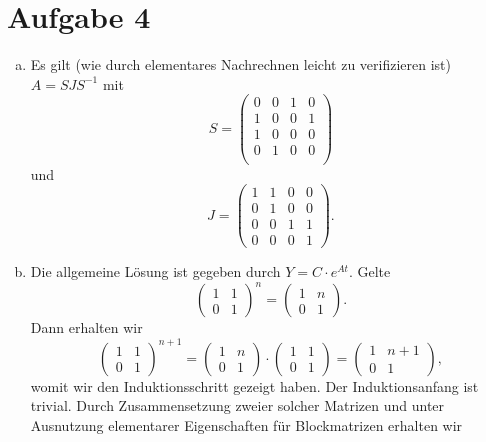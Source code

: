 \documentclass{article}
\begin{document}
\section*{Aufgabe 4}
\begin{enumerate}[(a)]
    \item Es gilt (wie durch elementares Nachrechnen leicht zu verifizieren ist) $A = SJS^{-1}$ mit
    \[
        S = \begin{pmatrix}
            0 & 0 & 1 & 0\\
            1 & 0 & 0 & 1\\
            1 & 0 & 0 & 0\\
            0 & 1 & 0 & 0\\
        \end{pmatrix}  
    \]
    und 
    \[
        J = \begin{pmatrix}
            1 & 1 & 0 & 0\\
            0 & 1 & 0 & 0\\
            0 & 0 & 1 & 1\\
            0 & 0 & 0 & 1
        \end{pmatrix}.
    \]
    \item Die allgemeine Lösung ist gegeben durch $Y = C \cdot e^{At}$.
    Gelte 
    \[
        \begin{pmatrix}
            1 & 1\\0 & 1
        \end{pmatrix}^n = \begin{pmatrix}
            1 & n\\0 & 1
        \end{pmatrix}.
    \]
    Dann erhalten wir 
    \[
        \begin{pmatrix}
            1 & 1\\0 & 1
        \end{pmatrix}^{n+1} = \begin{pmatrix}
             1 & n\\ 0 & 1
        \end{pmatrix} \cdot \begin{pmatrix}
            1 & 1\\0 & 1
        \end{pmatrix} = \begin{pmatrix}
            1 & n+1\\ 0 & 1
       \end{pmatrix},
    \]
    womit wir den Induktionsschritt gezeigt haben. Der Induktionsanfang ist trivial.
    Durch Zusammensetzung zweier solcher Matrizen und unter Ausnutzung elementarer Eigenschaften für Blockmatrizen erhalten wir

\end{enumerate}
\end{document}
